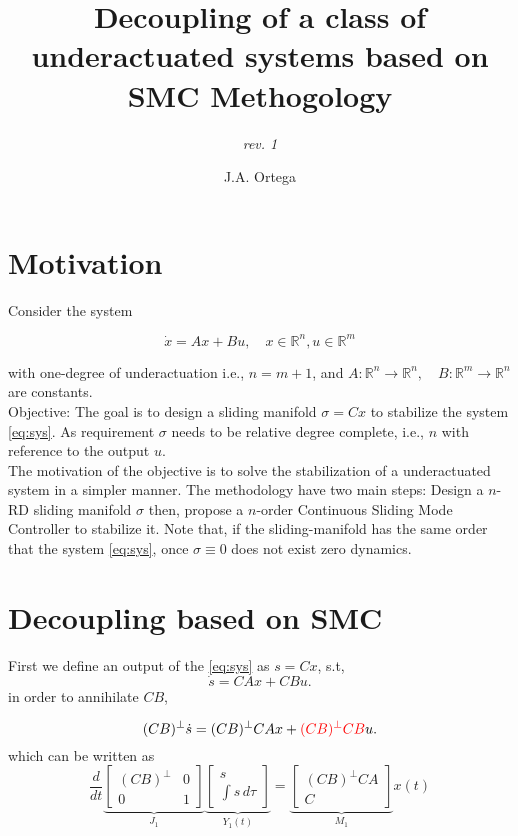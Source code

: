 \documentclass[10pt,letterpaper,twocolumn]{scrartcl}
\title{Decoupling of a class of underactuated systems based on SMC Methogology}
\subtitle{ \textit{rev. 1 }}
\author{J.A. Ortega}
\newcommand{\R}{\mathbb{R}}
\newcommand{\red}[1]{\textcolor{red}{#1}}
\begin{document}
\maketitle

\section{Motivation}

Consider the system

\begin{equation} \tag{$\Sigma$} \label{eq:sys}
    \dot{x} = A x + B u,\quad x \in \R^n, u \in \R^m
\end{equation}

\noindent with one-degree of underactuation i.e., $ n = m + 1 $, and $A: \R^n \to \R^n, \quad B: \R^m \to \R^n$ are constants.\\

{Objective:} The goal is to design a sliding manifold $\sigma = C x$ to stabilize the system \eqref{eq:sys}.
As requirement $\sigma$ needs to be relative degree complete, i.e.,  $n$ with reference to the output  $u$.\\
The motivation of the objective is to solve the stabilization of a underactuated system in a simpler manner.
The methodology have two main steps: Design a $n$-RD sliding manifold $\sigma$ then, propose a $n$-order Continuous Sliding Mode Controller to stabilize it.
Note that, if the sliding-manifold has the same order that the system \eqref{eq:sys}, once $\sigma \equiv 0$ does not exist zero dynamics.

\section{Decoupling based on SMC}

First we define an output of the \eqref{eq:sys} as $s= C x$, s.t,
\[
    \dot{s} = C A x + C B u
.\]
\noindent in order to annihilate $CB$,

\[
    (CB)^\perp \dot{s} = (CB)^\perp C A x + \red{(CB)^\perp C B} u
.\]
\noindent which can be written as
\[
    \frac{d}{dt} \underbrace{\begin{bmatrix} (C B)^\perp & 0 \\ 0 & 1 \end{bmatrix}}_{J_1} \underbrace{\begin{bmatrix} s \\ \int s \, d \tau \end{bmatrix}}_{Y_1(t)} =  \underbrace{\begin{bmatrix} (CB)^\perp C A \\ C \end{bmatrix}}_{M_1} x(t)
\]
\end{document}
